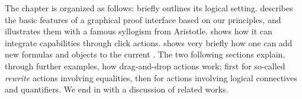 \begin{scope}
The chapter is organized as follows:  briefly outlines its
logical setting.  describes the basic features of a graphical
proof interface based on our principles, and illustrates them with a famous
syllogism from Aristotle.  shows how it can integrate
 capabilities through click actions. 
shows very briefly how one can add new formulas and objects to the current
. The two following sections explain, through further examples, how
drag-and-drop actions work; first for so-called \emph{rewrite} actions involving
equalities, then for actions involving logical connectives and quantifiers. We
end in  with a discussion of related works.






\end{scope}
